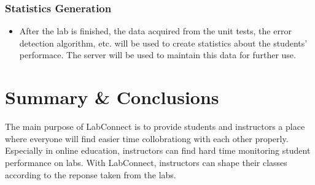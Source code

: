 \documentclass[a4paper, 12pt]{article}
\begin{document}
    \subsubsection{Statistics Generation}

    \begin{itemize}
      \item After the lab is finished, the data acquired from the unit tests, the error detection algorithm, etc. will be used
      to create statistics about the students' performace. The server will be used to maintain this data for further use.
    \end{itemize}

    \section{Summary \& Conclusions}

    The main purpose of LabConnect is to provide students and instructors a place where everyone will find easier time
    collobrationg with each other properly. Especially in online education, instructors can find hard time monitoring student
    performance on labs. With LabConnect, instructors can shape their classes according to the reponse taken from the labs.

    \pagebreak

    \printbibliography
\end{document}
